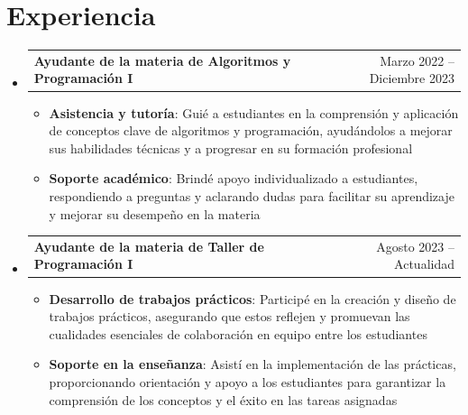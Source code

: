 \documentclass[letterpaper,11pt]{article}
\makeatletter
\newcommand{\resumeItem}[1]{
  \item\small{
    {#1 \vspace{-2pt}}
  }
}
\newcommand{\resumeSubSubheading}[2]{
    \item
    \begin{tabular*}{0.97\textwidth}{l@{\extracolsep{\fill}}r}
      \textit{\small#1} & \textit{\small #2} \\
    \end{tabular*}\vspace{-7pt}
}
\newcommand{\resumeExperienceheading}[2]{
  \vspace{-2pt}\item
    \begin{tabular*}{0.97\textwidth}[t]{l@{\extracolsep{\fill}}r}
      \textbf{#1} & #2 
    \end{tabular*}\vspace{-7pt}
}
\newcommand{\resumeSubHeadingListStart}{\begin{itemize}[leftmargin=0.15in, label={}]}
\newcommand{\resumeSubHeadingListEnd}{\end{itemize}}
\newcommand{\resumeItemListStart}{\begin{itemize}}
\newcommand{\resumeItemListEnd}{\end{itemize}\vspace{-5pt}}
\makeatother
\begin{document}
\section{Experiencia}
  \resumeSubHeadingListStart

    \resumeExperienceheading
      {Ayudante de la materia de Algoritmos y Programación I}{Marzo 2022 -- Diciembre 2023}
      \resumeItemListStart
        \resumeItem{\textbf{Asistencia y tutoría}: Guié a estudiantes en la comprensión y aplicación de conceptos clave de algoritmos y programación, ayudándolos a mejorar sus habilidades técnicas y a progresar en su formación profesional}
        \resumeItem{\textbf{Soporte académico}: Brindé apoyo individualizado a estudiantes, respondiendo a preguntas y aclarando dudas para facilitar su aprendizaje y mejorar su desempeño en la materia}
      \resumeItemListEnd

    \resumeExperienceheading
      {Ayudante de la materia de Taller de Programación I}{Agosto 2023 -- Actualidad}
      \resumeItemListStart
        \resumeItem{\textbf{Desarrollo de trabajos prácticos}: Participé en la creación y diseño de trabajos prácticos, asegurando que estos reflejen y promuevan las cualidades esenciales de colaboración en equipo entre los estudiantes}
        \resumeItem{\textbf{Soporte en la enseñanza}: Asistí en la implementación de las prácticas, proporcionando orientación y apoyo a los estudiantes para garantizar la comprensión de los conceptos y el éxito en las tareas asignadas}
    \resumeItemListEnd
      

  \resumeSubHeadingListEnd

\end{document}
